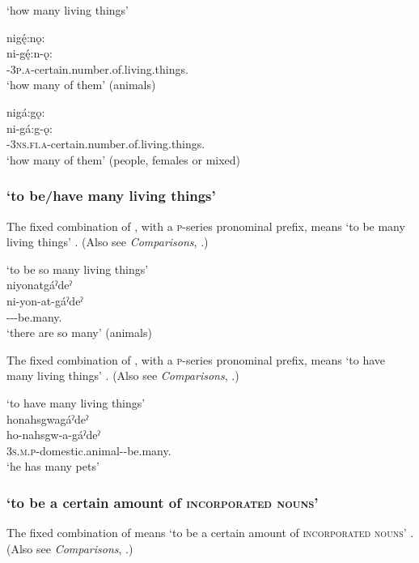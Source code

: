\ea\label{ex:niex8}  ‘how many living things’

\ea nigę́:nǫ:\\
\gll ni-gę́:n-ǫ:\\
{\partitive}-\textsc{3p.a}-certain.number.of.living.things.{\stative}\\
\glt `how many of them' (animals)

\ex nigá:gǫ:\\
\gll ni-gá:g-ǫ:\\
{\partitive}-\textsc{3ns.fi.a}-certain.number.of.living.things.{\stative}\\
\glt `how many of them' (people, females or mixed)
\z
\z


\subsubsection*{ ‘to be/have many living things’} \label{[ni-O-at/incorporated noun-gaˀdeˀ]}
The fixed combination of , with a \textsc{p}-series pronominal prefix, means ‘to be many living things’ . (Also see \textit{Comparisons}, .)

\ea\label{ex:niex9}  ‘to be so many living things’\\
niyonatgáˀdeˀ\\
\gll ni-yon-at-gáˀdeˀ\\
{\partitive}--{\semireflexive}-be.many.{\stative}\\
\glt `there are so many' (animals)
\z


The fixed combination of  , with a \textsc{p}-series pronominal prefix, means ‘to have many living things’ . (Also see \textit{Comparisons}, .)

\ea\label{ex:niex99}  ‘to have many living things’\\
honahsgwagáˀdeˀ\\
\gll ho-nahsgw-a-gáˀdeˀ\\
\textsc{3s.m.p}-domestic.animal-{\joinerA}-be.many.{\stative}\\
\glt `he has many pets'
\z


\subsubsection*{ ‘to be a certain amount of \textsc{incorporated nouns}’} \label{[ni-incorporated noun-age:]}
The fixed combination of  means ‘to be a certain amount of \textsc{incorporated nouns}’ . (Also see \textit{Comparisons}, .)

